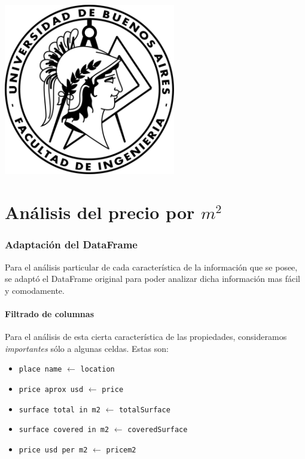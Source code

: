 \documentclass[a4paper, 10pt]{article}
\def\code#1{\texttt{#1}}
\begin{document}
    \newpage

    \begin{center}
        \includegraphics[width=7.5cm, height=7.5cm]{images/logo}
    \end{center}


    \maketitle
    \newpage
    \tableofcontents
    \newpage
	\part{Análisis del precio por $m^2$}
		\section{Adaptación del DataFrame}
			Para el análisis particular de cada característica de la información que se posee, se adaptó el DataFrame
			original para poder analizar dicha información mas fácil y comodamente.
			\subsection{Filtrado de columnas}
				Para el análisis de esta cierta característica de las propiedades, consideramos \emph{importantes}
				sólo a algunas celdas. Estas son:
				\begin{itemize}
					\item \code{place name} $\leftarrow$ \code{location}
					\item \code{price aprox usd} $\leftarrow$ \code{price}
					\item \code{surface total in m2} $\leftarrow$ \code{totalSurface}
					\item \code{surface covered in m2} $\leftarrow$ \code{coveredSurface}
					\item \code{price usd per m2} $\leftarrow$ \code{pricem2}		
				\end{itemize}
\end{document}
